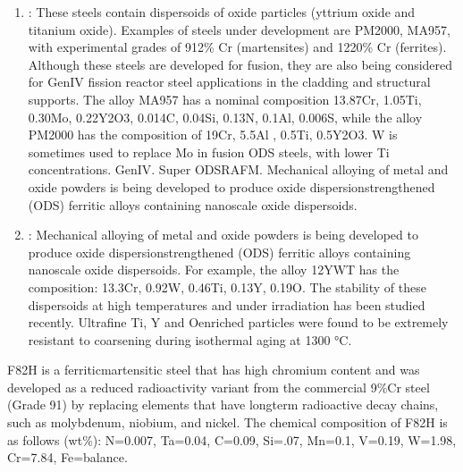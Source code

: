 \documentclass[letterpaper,10pt,english]{jupyterBook}
\begin{document}
\begin{enumerate}
		\item {} 
		\sphinxAtStartPar
		: These steels contain dispersoids of oxide particles (yttrium oxide and titanium oxide). Examples of steels under development are PM2000, MA957, with experimental grades of 9\sphinxhyphen{}12\% Cr (martensites) and 12\sphinxhyphen{}20\% Cr (ferrites). Although these steels are developed for fusion, they are also being considered for Gen\sphinxhyphen{}IV fission reactor steel applications in the cladding and structural supports. The alloy MA957 has a nominal composition 13.87Cr, 1.05Ti, 0.30Mo, 0.22Y2O3, 0.014C, 0.04Si, 0.13N, 0.1Al, 0.006S, while the alloy PM2000 has the composition of 19Cr, 5.5Al , 0.5Ti, 0.5Y2O3. W is sometimes used to replace Mo in fusion ODS steels, with lower Ti concentrations.
		Gen\sphinxhyphen{}IV. Super ODS\sphinxhyphen{}RAFM. Mechanical alloying of metal and oxide powders is being developed to
		produce oxide dispersion\sphinxhyphen{}strengthened (ODS) ferritic alloys containing nano\sphinxhyphen{}scale oxide dispersoids.
		
		\item {} 
		\sphinxAtStartPar
		: Mechanical alloying of metal and oxide powders is being developed to produce oxide dispersion\sphinxhyphen{}strengthened (ODS) ferritic alloys containing nano\sphinxhyphen{}scale oxide dispersoids. For example, the alloy 12YWT has the composition: 13.3Cr, 0.92W, 0.46Ti, 0.13Y, 0.19O. The stability of these dispersoids at high temperatures and under irradiation has been studied recently. Ultrafine Ti\sphinxhyphen{}, Y\sphinxhyphen{} and O\sphinxhyphen{}enriched particles were found to be extremely resistant to coarsening during isothermal aging at 1300 °C.
		
	\end{enumerate}
	
	\sphinxAtStartPar
	F82H is a ferritic\sphinxhyphen{}martensitic steel that has high chromium content and was developed as a reduced radioactivity variant from the commercial 9\%\sphinxhyphen{}Cr steel (Grade 91) by replacing elements that have long\sphinxhyphen{}term radioactive decay chains, such as molybdenum, niobium, and nickel. The chemical composition of F82H is as follows (wt\%): N=0.007, Ta=0.04, C=0.09, Si=.07, Mn=0.1, V=0.19, W=1.98, Cr=7.84, Fe=balance.
	
\end{document}
